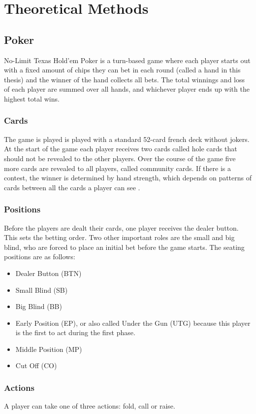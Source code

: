 \chapter{Theoretical Methods}

\section{Poker}
No-Limit Texas Hold'em Poker is a turn-based game where each player starts out with a fixed amount of chips they can bet in each round (called a hand in this thesis) and the winner of the hand collects all bets. The total winnings and loss of each player are summed over all hands, and whichever player ends up with the highest total wins.

\subsection{Cards}
The game is played is played with a standard 52-card french deck without jokers. At the start of the game each player receives two cards called hole cards that should not be revealed to the other players. Over the course of the game five more cards are revealed to all players, called community cards. If there is a contest, the winner is determined by hand strength, which depends on patterns of cards between all the cards a player can see \cite{HoldemHandvalues}.

\subsection{Positions}
Before the players are dealt their cards, one player receives the dealer button. This sets the betting order. Two other important roles are the small and big blind, who are forced to place an initial bet before the game starts. The seating positions are as follows:
\begin{itemize}
    \item Dealer Button (BTN)
    \item Small Blind (SB)
    \item Big Blind (BB)
    \item Early Position (EP), or also called Under the Gun (UTG) because this player is the first to act during the first phase.
    \item Middle Position (MP)
    \item Cut Off (CO)
\end{itemize}

\subsection{Actions}
A player can take one of three actions: fold, call or raise.

